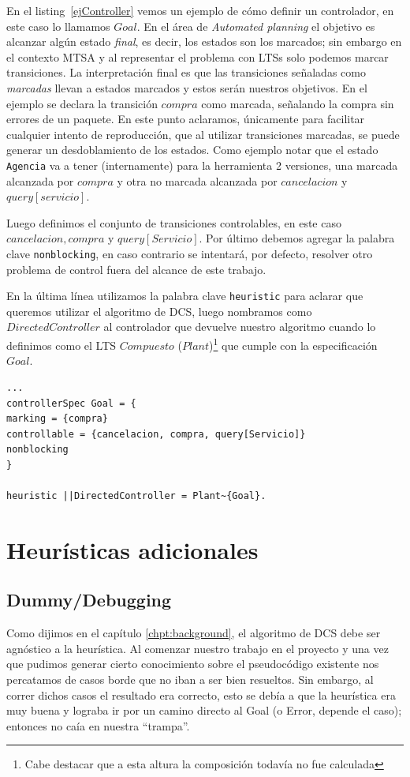 En el listing~\ref{ejController} vemos un ejemplo de cómo definir un controlador, en este caso lo llamamos $Goal$. En el área de \textit{Automated planning} el objetivo es alcanzar algún estado \textit{final}, es decir, los estados son los marcados; sin embargo en el contexto MTSA y al representar el problema con LTSs solo podemos marcar transiciones. La interpretación final es que las transiciones señaladas como \textit{marcadas} llevan a estados marcados y estos serán nuestros objetivos. En el ejemplo se declara la transición $compra$ como marcada, señalando la compra sin errores de un paquete. En este punto aclaramos, únicamente para facilitar cualquier intento de reproducción, que al utilizar transiciones marcadas, se puede generar un desdoblamiento de los estados. Como ejemplo notar que el estado \texttt{Agencia} va a tener (internamente) para la herramienta 2 versiones, una marcada alcanzada por $compra$ y otra no marcada alcanzada por $cancelacion$ y $query[servicio]$.

Luego definimos el conjunto de transiciones controlables, en este caso $cancelacion, compra$ y $ query[Servicio]$. Por último debemos agregar la palabra clave \texttt{nonblocking}, en caso contrario se intentará, por defecto, resolver otro problema de control fuera del alcance de este trabajo.

En la última línea utilizamos la palabra clave \texttt{heuristic} para aclarar que queremos utilizar el algoritmo de DCS, luego nombramos como $DirectedController$ al controlador que devuelve nuestro algoritmo cuando lo definimos como el LTS $Compuesto$ ($Plant$)\footnote{Cabe destacar que a esta altura la composición todavía no fue calculada} que cumple con la especificación $Goal$.

\begin{lstlisting}[language = mtsa, caption=Ejemplo de Controller y DCS, label=ejController]
...
controllerSpec Goal = {
marking = {compra}
controllable = {cancelacion, compra, query[Servicio]}
nonblocking
}

heuristic ||DirectedController = Plant~{Goal}.
\end{lstlisting}

\section{Heurísticas adicionales}\label{chpt:heurist-nuevas}
\subsection{Dummy/Debugging}
Como dijimos en el capítulo \ref{chpt:background}, el algoritmo de DCS debe ser agnóstico a la heurística. Al comenzar nuestro trabajo en el proyecto y una vez que pudimos generar cierto conocimiento sobre el pseudocódigo existente nos percatamos de casos borde que no iban a ser bien resueltos. Sin embargo, al correr dichos casos el resultado era correcto, esto se debía a que la heurística era muy buena y lograba ir por un camino directo al Goal (o Error, depende el caso); entonces no caía en nuestra ``trampa''.

